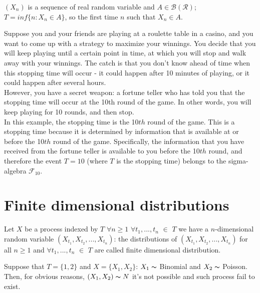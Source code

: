 \begin{example}
    $(X_n)$ is a sequence of real random variable and $A \in \mathcal{B}(\mathcal{R})$; $T = inf\{n: X_n \in A\}$, so the first time $n$ such that $X_n \in A$. %
\end{example}

\begin{example}[Casinò]

   Suppose you and your friends are playing at a roulette table in a casino, and you want to come up with a strategy to maximize your winnings. You decide that you will keep playing until a certain point in time, at which you will stop and walk away with your winnings. The catch is that you don't know ahead of time when this stopping time will occur - it could happen after 10 minutes of playing, or it could happen after several hours.\\
However, you have a secret weapon: a fortune teller who has told you that the stopping time will occur at the 10th round of the game. In other words, you will keep playing for 10 rounds, and then stop.\\
In this example, the stopping time is the 10$th$ round of the game. This is a stopping time because it is determined by information that is available at or before the 10$th$ round of the game. Specifically, the information that you have received from the fortune teller is available to you before the 10$th$ round, and therefore the event ${T=10}$ (where $T$ is the stopping time) belongs to the sigma-algebra $\mathcal{F}_{10}$.   
\end{example}




\section{Finite dimensional distributions}
\begin{definition}
    Let $X$ be a process indexed by $T$ $\forall n\geq 1$ $\forall t_1, ..., t_n$ $\in$ $T$ we have a $n$-dimensional random variable $(X_{t_{1}}, X_{t_{2}}, ..., X_{t_{n}})$: the distributions of $(X_{t_{1}}, X_{t_{2}}, ..., X_{t_{n}})$ for all $n \geq 1$ and $\forall t_1, ..., t_n$ $\in$ $T$ are called finite dimensional distribution.
\end{definition}

\begin{example}
    Suppose that $T = \{1,2\}$ and $X = \{X_1, X_2\}$: $X_1 \thicksim$ Binomial and $X_2 \thicksim$ Poisson. Then, for obvious reasons, $(X_1, X_2) \thicksim N$ it's not possible and such process fail to exist. 
\end{example}

